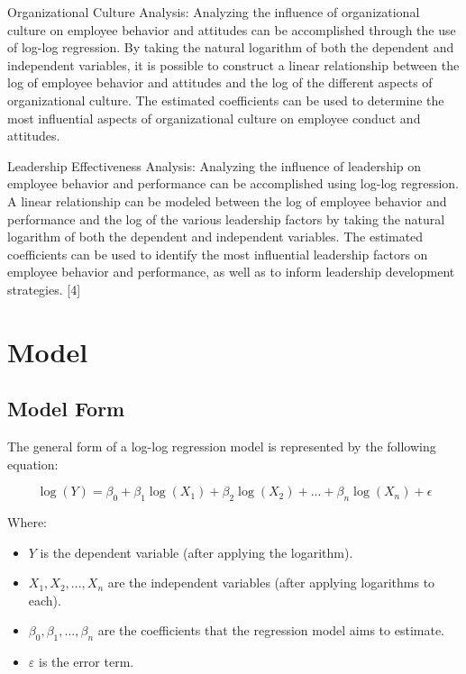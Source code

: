 \documentclass[
  letterpaper,
  DIV=11,
  numbers=noendperiod]{scrreport}
\begin{document}
Organizational Culture Analysis: Analyzing the influence of
organizational culture on employee behavior and attitudes can be
accomplished through the use of log-log regression. By taking the
natural logarithm of both the dependent and independent variables, it is
possible to construct a linear relationship between the log of employee
behavior and attitudes and the log of the different aspects of
organizational culture. The estimated coefficients can be used to
determine the most influential aspects of organizational culture on
employee conduct and attitudes.

Leadership Effectiveness Analysis: Analyzing the influence of leadership
on employee behavior and performance can be accomplished using log-log
regression. A linear relationship can be modeled between the log of
employee behavior and performance and the log of the various leadership
factors by taking the natural logarithm of both the dependent and
independent variables. The estimated coefficients can be used to
identify the most influential leadership factors on employee behavior
and performance, as well as to inform leadership development strategies.
{[}4{]}

\section{Model}\label{model}

\subsection{Model Form}\label{model-form}

The general form of a log-log regression model is represented by the
following equation:

\begin{equation}
\log(Y) = \beta_0 + \beta_1\log(X_1) + \beta_2\log(X_2) + ... + \beta_n\log(X_n) + \epsilon
\end{equation}

Where:

\begin{itemize}
\item
  \(Y\) is the dependent variable (after applying the logarithm).
\item
  \(X_1, X_2, ..., X_n\) are the independent variables (after applying
  logarithms to each).
\item
  \(β_0, β_1, ..., β_n\) are the coefficients that the regression model
  aims to estimate.
\item
  \(ε\) is the error term.
\end{itemize}
\end{document}
